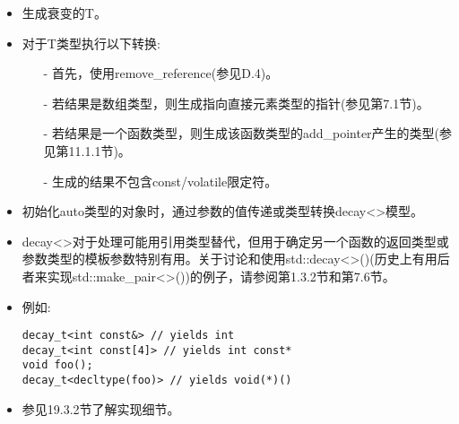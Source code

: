 \begin{itemize}
\item
生成衰变的T。

\item
对于T类型执行以下转换:

\begin{itemize}
\item[-]
首先，使用remove\_reference(参见D.4)。

\item[-]
若结果是数组类型，则生成指向直接元素类型的指针(参见第7.1节)。

\item[-]
若结果是一个函数类型，则生成该函数类型的add\_pointer产生的类型(参见第11.1.1节)。

\item[-]
生成的结果不包含const/volatile限定符。
\end{itemize}

\item
初始化auto类型的对象时，通过参数的值传递或类型转换decay<>模型。

\item
decay<>对于处理可能用引用类型替代，但用于确定另一个函数的返回类型或参数类型的模板参数特别有用。关于讨论和使用std::decay<>()(历史上有用后者来实现std::make\_pair<>())的例子，请参阅第1.3.2节和第7.6节。

\item
例如:
\begin{lstlisting}[style=styleCXX]
decay_t<int const&> // yields int
decay_t<int const[4]> // yields int const*
void foo();
decay_t<decltype(foo)> // yields void(*)()
\end{lstlisting}

\item
参见19.3.2节了解实现细节。
\end{itemize}















